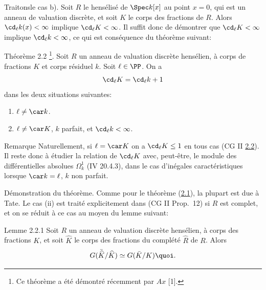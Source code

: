 \documentclass[10pt]{../fichiers-configuration-latex/smfart}
\begin{document}
Traitons\pageoriginale le cas b). Soit $R$ le hensélisé de $\Spec
k[x]$ au point $x=0$, qui est un anneau de valuation discrète, et soit
$K$ le corps des fractions de $R$. Alors $\cd_{\ell}k(x)<\infty$
implique $\cd_{\ell}K<\infty$. Il suffit donc de démontrer que
$\cd_{\ell}K<\infty$ implique $\cd_{\ell}k<\infty$, ce qui est
conséquence du théorème suivant:

\begin{enonce*}{Théorème 2.2}
\footnote{Ce théorème a été démontré récemment par $Ax$
    [1].}. Soit $R$ un anneau de valuation discrète hensélien, à
    corps de fractions $K$ et corps résiduel $k$. Soit $\ell\in
    \PP$. On a
$$
\cd_{\ell}K=\cd_{\ell}k+1
$$
dans les deux situations suivantes:
\begin{enumerate}
\renewcommand{\theenumi}{\roman{enumi}}
\renewcommand{\labelenumi}{(\theenumi)}
\item $\ell\neq \car k$.

\item $\ell \neq \car K$, $k$ parfait, et $\cd_{\ell}k<\infty$.
\end{enumerate}
\end{enonce*}

\begin{enonce*}[remark]{Remarque}
Naturellement, si $\ell=\car K$ on a $\cd_{\ell}K\leq 1$ en tous cas
(CG II \hyperref[X.thm2.2]{2.2}). Il reste donc à étudier la relation de $\cd_{\ell}K$
avec, peut-être, le module des différentielles absolues $\Omega^1_k$
(\EGA IV 20.4.3), dans le cas d'inégales caractéristiques lorsque $\car
k=\ell$, $k$ non parfait. %
\end{enonce*}

Démonstration du théorème. Comme pour le théorème (\hyperref[X.thm2.1]{2.1}), la plupart
est due à Tate. Le cas (ii) est traité explicitement dans (CG II
Prop.~12) si $R$ est complet, et on se réduit à ce cas au moyen du
lemme suivant:

\begin{enonce*}{Lemme 2.2.1}
Soit $R$ un anneau de valuation discrète hensélien, à corps des
fractions $K$, et soit $\widehat{K}$ le corps des fractions du
complété $\widehat{R}$ de $R$. Alors
$$
G(\bar{\widehat{K}}/\widehat{K})\simeq G(\bar{K}/K){\quoi}.
$$
\end{enonce*}
\end{document}
